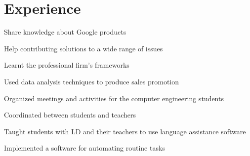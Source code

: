\documentclass[]{deedy-resume-openfont}
\begin{document}
\hfill
\begin{minipage}[t]{0.66\textwidth} 



\section{Experience}
\vspace{\topsep} %
\begin{tightemize}
\item Share knowledge about Google products
\item Help contributing solutions to a wide range of issues
\end{tightemize}
\sectionsep

\begin{tightemize}
\item Learnt the professional firm's frameworks
\item Used data analysis techniques to produce sales promotion
\end{tightemize}
\sectionsep

\begin{tightemize}
\item Organized meetings and activities for the computer engineering students
\item Coordinated between students and teachers
\end{tightemize}
\sectionsep

\begin{tightemize}
\item Taught students with LD and their teachers to use language assistance software
\item Implemented a software for automating routine tasks
\end{tightemize}
\sectionsep



\end{minipage}
\end{document}
